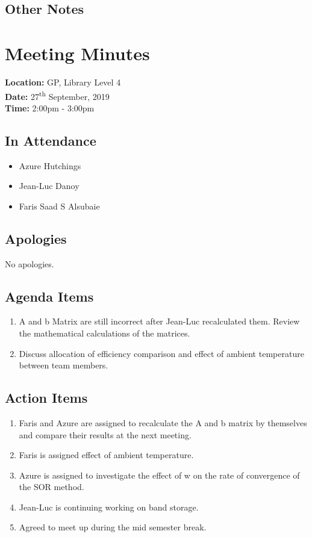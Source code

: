 \documentclass{article}
\begin{document}
\subsection*{Other Notes}

\pagebreak

\section{Meeting Minutes}
\textbf{Location:} GP, Library Level 4 \\
\textbf{Date:} 27\textsuperscript{th} September, 2019 \\
\textbf{Time:} 2:00pm - 3:00pm

\subsection*{In Attendance}
\begin{itemize}
\item Azure Hutchings
\item Jean-Luc Danoy
\item Faris Saad S Alsubaie
\end{itemize}

\subsection*{Apologies}
No apologies. 

\subsection*{Agenda Items}
\begin{enumerate}
\item A and b Matrix are still incorrect after Jean-Luc recalculated them. Review the mathematical calculations of the matrices.
\item Discuss allocation of efficiency comparison and effect of ambient temperature between team members. 
\ 
\end{enumerate}

\subsection*{Action Items}
\begin{enumerate}
\item Faris and Azure are assigned to recalculate the A and b matrix by themselves and compare their results at the next meeting.
\item Faris is assigned effect of ambient temperature.
\item Azure is assigned to investigate the effect of w on the rate of convergence of the SOR method.
\item Jean-Luc is continuing working on band storage.
\item Agreed to meet up during the mid semester break.
\end{enumerate}
\end{document}
